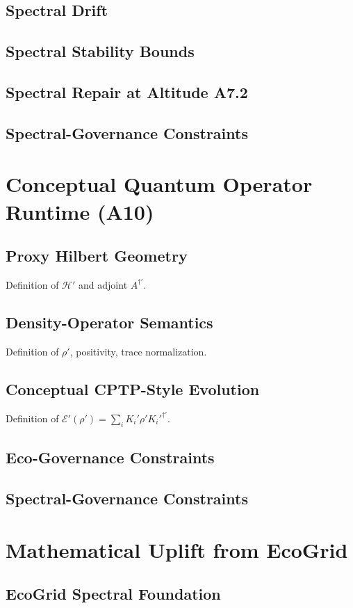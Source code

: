 \documentclass[11pt]{article}
\begin{document}
\subsection{Spectral Drift}
\subsection{Spectral Stability Bounds}
\subsection{Spectral Repair at Altitude A7.2}
\subsection{Spectral-Governance Constraints}

\section{Conceptual Quantum Operator Runtime (A10)}
\subsection{Proxy Hilbert Geometry}
Definition of $\mathcal{H}'$ and adjoint $A^{\dagger'}$.
\subsection{Density-Operator Semantics}
Definition of $\rho'$, positivity, trace normalization.
\subsection{Conceptual CPTP-Style Evolution}
Definition of $\mathcal{E}'(\rho') = \sum_i K_i' \rho' K_i'^{\dagger'}$.
\subsection{Eco-Governance Constraints}
\subsection{Spectral-Governance Constraints}

\section{Mathematical Uplift from EcoGrid}
\subsection{EcoGrid Spectral Foundation}
\end{document}
